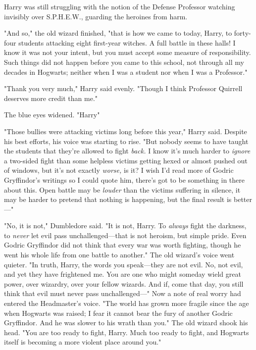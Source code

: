 Harry was still struggling with the notion of the Defense Professor watching
invisibly over S.P.H.E.W., guarding the heroines from harm.

"And so," the old wizard finished, "that is how we came to today, Harry, to
forty-four students attacking eight first-year witches. A full battle in these
halls! I know it was not your intent, but you must accept some measure of
responsibility. Such things did not happen before you came to this school, not
through all my decades in Hogwarts; neither when I was a student nor when I was
a Professor."

"Thank you very much," Harry said evenly. "Though I think Professor Quirrell
deserves more credit than me."

The blue eyes widened. "Harry{\el}"

"Those bullies were attacking victims long before this year," Harry said.
Despite his best efforts, his voice was starting to rise. "But nobody seems to
have taught the students that they're allowed to fight \emph{back.} I know it's
much harder to \emph{ignore} a two-sided fight than some helpless victims
getting hexed or almost pushed out of windows, but it's not exactly
\emph{worse,} is it? I wish I'd read more of Godric Gryffindor's writings so I
could quote him, there's got to be something in there about this. Open battle
may be \emph{louder} than the victims suffering in silence, it may be harder to
pretend that nothing is happening, but the final result is better\mbox{---}"

"No, it is not," Dumbledore said. "It is not, Harry. To \emph{always} fight the
darkness, to \emph{never} let evil pass unchallenged---that is not heroism, but
simple pride. Even Godric Gryffindor did not think that every war was worth
fighting, though he went his whole life from one battle to another." The old
wizard's voice went quieter. "In truth, Harry, the words you speak---they are
not evil. No, not evil, and yet they have frightened me. You are one who might
someday wield great power, over wizardry, over your fellow wizards. And if,
come that day, you still think that evil must never pass unchallenged\mbox{---}" Now a
note of real worry had entered the Headmaster's voice. "The world has grown
more fragile since the age when Hogwarts was raised; I fear it cannot bear the
fury of another Godric Gryffindor. And he was slower to his wrath than you."
The old wizard shook his head. "You are too ready to fight, Harry. Much too
ready to fight, and Hogwarts itself is becoming a more violent place around
you."


